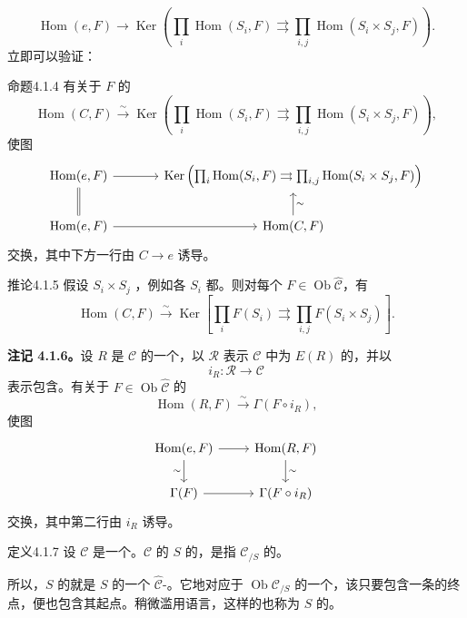 \[
\operatorname{Hom}(e,F)\longrightarrow
\operatorname{Ker}\left(\prod_i\operatorname{Hom}(S_i,F)\rightrightarrows
\prod_{i,j}\operatorname{Hom}(S_i\times S_j,F)\right).
\]
立即可以验证：
\begin{SGAresult}{命题}{4.1.4}
有关于 $F$ 的
\[
\operatorname{Hom}(C,F)\xrightarrow{\sim}
\operatorname{Ker}\left(\prod_i\operatorname{Hom}(S_i,F)\rightrightarrows
\prod_{i,j}\operatorname{Hom}(S_i\times S_j,F)\right),
\]
使图
\[
\begin{tikzcd}[column sep=large]
\operatorname{Hom}(e,F)\arrow[r]\arrow[d,equal]&
\operatorname{Ker}\left(\prod_i\operatorname{Hom}(S_i,F)\rightrightarrows
\prod_{i,j}\operatorname{Hom}(S_i\times S_j,F)\right)\\
\operatorname{Hom}(e,F)\arrow[r]&\operatorname{Hom}(C,F)\arrow[u,"\sim"']
\end{tikzcd}
\]
交换，其中下方一行由 $C\to e$ 诱导。
\end{SGAresult}
\begin{SGAresult}{推论}{4.1.5}
假设 $S_i\times S_j$ ，例如各 $S_i$ 都。则对每个 $F\in\operatorname{Ob}\widehat{\mathcal C}$，有
\[
\operatorname{Hom}(C,F)\xrightarrow{\sim}
\operatorname{Ker}\left[\prod_i F(S_i)\rightrightarrows\prod_{i,j}F(S_i\times S_j)\right].
\]
\end{SGAresult}
\textbf{注记 4.1.6。}设 $R$ 是 $\mathcal C$ 的一个，以 $\mathcal R$ 表示 $\mathcal C$ 中为 $E(R)$ 的，并以
\[
i_R:\mathcal R\longrightarrow\mathcal C
\]
表示包含。有关于 $F\in\operatorname{Ob}\widehat{\mathcal C}$ 的
\[
\operatorname{Hom}(R,F)\xrightarrow{\sim}\Gamma(F\circ i_R),
\]
使图
\[
\begin{tikzcd}
\operatorname{Hom}(e,F)\arrow[r]\arrow[d,"\sim"']&\operatorname{Hom}(R,F)\arrow[d,"\sim"]\\
\Gamma(F)\arrow[r]&\Gamma(F\circ i_R)
\end{tikzcd}
\]
交换，其中第二行由 $i_R$ 诱导。
\begin{SGAresult}{定义}{4.1.7}
设 $\mathcal C$ 是一个。$\mathcal C$ 的 $S$ 的，是指 $\mathcal C_{/S}$ 的。
\end{SGAresult}
所以，$S$ 的就是 $S$ 的一个 $\widehat{\mathcal C}$-。它地对应于 $\operatorname{Ob}\mathcal C_{/S}$ 的一个，该只要包含一条的终点，便也包含其起点。稍微滥用语言，这样的也称为 $S$ 的。

